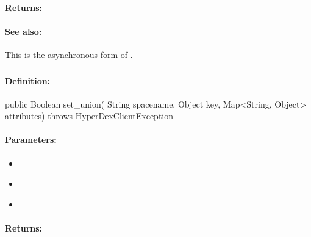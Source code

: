 \paragraph{Returns:}


\paragraph{See also:}  This is the asynchronous form of .

\pagebreak
\subsubsection{}
\label{api:java:set_union}


\paragraph{Definition:}
\begin{javacode}
public Boolean set_union(
        String spacename,
        Object key,
        Map<String, Object> attributes) throws HyperDexClientException
\end{javacode}

\paragraph{Parameters:}
\begin{itemize}[noitemsep]
\item {}\\

\item {}\\

\item {}\\

\end{itemize}

\paragraph{Returns:}


